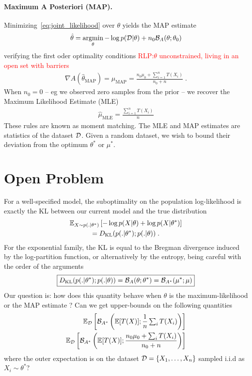 \documentclass[twoside]{article}
\newcommand{\RLP}[1]{\textcolor{red}{RLP:#1}}
\newcommand*{\expect}[2][]{\ensuremath{\mathbb{E}_{#1} \left[ #2 \right] }} %
\newcommand{\logpart}{A}
\newcommand{\bregman}{\cB_\logpart}
\newcommand{\bregmanconj}{\cB_{\logpart^*}}
\newcommand{\natp}{\theta}
\newcommand{\meanp}{\mu}
\begin{document}
\paragraph{Maximum A Posteriori (MAP).}
Minimizing~\eqref{eq:joint_likelihood} over $\natp$ yields the MAP estimate
\begin{align}
    \hat \natp = \argmin_\natp -\log p(\cD|\natp) + n_0 \bregman(\natp ; \natp_0)
\end{align}
verifying the first oder optimality conditions \RLP{$\natp$ unconstrained, living in an open set with barriers}
\begin{align}
    \nabla \logpart(\hat \natp_\text{MAP}) = \hat \meanp_\text{MAP}
    = \frac{n_0 \meanp_0 + \sum_{i=1}^n T(X_i) }{n_0+n} \; .
\end{align}
When $n_0=0$ -- eg we observed zero samples from the prior -- we recover the Maximum Likelihood Estimate (MLE)
\begin{align}
	\hat \mu_\text{MLE} = \frac{\sum_{i=1}^n T(X_i)}{n}
\end{align}
These rules are known as moment matching.
The MLE and MAP estimates are statistics of the dataset ${\mathcal D}$. Given a random dataset, we wish to bound their deviation from the optimum $\natp^*$ or $\meanp^*$.


\section{Open Problem}

For a well-specified model, the suboptimality on the population log-likelihood is exactly the KL between our current model and the true distribution
\begin{multline}
    \expect[X\sim p(.|\natp^*)]{-\log p(X|\natp) + \log p(X|\natp^*) } \\
	= \KL( p(.|\natp^*) ; p(.|\natp)) \; .
\end{multline}
For the exponential family, the KL is equal to the Bregman divergence induced by the log-partition function, or alternatively by the entropy, being careful with the order of the arguments 
\begin{align}
\boxed{
	\KL( p(.|\natp^*) ; p(.|\natp))
    = \bregman (\natp ; \natp^*)
    = \bregmanconj ( \meanp^* ; \meanp)
}
\end{align}
Our question is: how does this quantity behave when $\natp$ is the maximum-likelihood or the MAP estimate ? Can we get upper-bounds on the following quantities
\begin{align}
	\label{eq:bregmanMLE}
	\expect[\cD]{\bregmanconj \left (\E [T(X)] ;  \inv{n}  \smallsum_i T(X_i) \right )} \\
	\label{eq:bregmanMAP}
	\expect[\cD]{\bregmanconj \left (\E [T(X)] ; \frac{n_0 \mu_0 + \smallsum_i T(X_i)}{n_0+n} \right )} 
\end{align}
where the outer expectation is on the dataset ${\mathcal D} = \{X_1, \dots, X_n \}$ sampled i.i.d as $X_i\sim \natp^*$?
\end{document}
